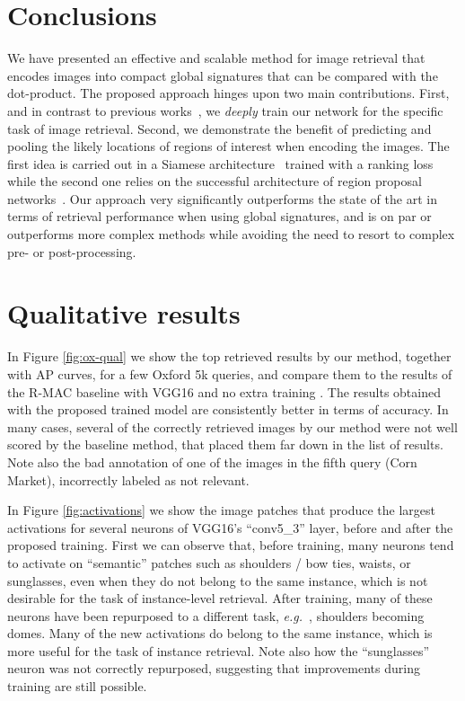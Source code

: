 \documentclass[runningheads]{llncs}
\def\eg{\emph{e.g.}~}
\begin{document}
 \section{Conclusions}
 \label{sec:conclusions}
 We have presented an effective and scalable method for image retrieval that encodes images into compact global signatures that can be compared with the dot-product. 
 The proposed approach hinges upon two main contributions. First, and in contrast to previous works~\cite{Razavian2014,Perronnin2015,Gong2014}, we \emph{deeply}
 train our network for the specific task of image retrieval.
 Second, we demonstrate the benefit of predicting and pooling the likely locations of regions of interest when encoding the images.
 The first idea is carried out in a Siamese architecture~\cite{Hadsell2006} trained with a ranking loss while the second one relies on the successful architecture of region proposal networks~\cite{Ren2015faster}.
 Our approach very significantly outperforms the state of the art in terms of retrieval performance when using global signatures, and is on par or outperforms more complex methods while avoiding the need to resort to complex pre- or post-processing.


 
 

\clearpage
\appendix
\section{Qualitative results}\label{s:qualitative}
In Figure \ref{fig:ox-qual} we show the top retrieved results by our method, together with AP curves, for a few Oxford 5k queries, and compare them to the results of the R-MAC baseline with VGG16 and no extra training \cite{Tolias2016}. 
The results obtained with the proposed trained model are consistently better in terms of accuracy.
In many cases, several of the correctly retrieved images by our method were not well scored by the baseline method, that placed them far down in the list of results. 
Note also the bad annotation of one of the images in the fifth query (Corn Market), incorrectly labeled as not relevant.

In Figure \ref{fig:activations} we show the image patches that produce the largest activations for several neurons of VGG16's ``conv5\_3'' layer, before and after the proposed training.
First we can observe that, before training, many neurons tend to activate on ``semantic'' patches such as shoulders / bow ties, waists, or sunglasses, even when they do not belong to the same instance, which is not desirable for the task of instance-level retrieval.
After training, many of these neurons have been repurposed to a different task, \eg, shoulders becoming domes.
Many of the new activations do belong to the same instance, which is more useful for the task of instance retrieval.
Note also how the ``sunglasses'' neuron was not correctly repurposed, suggesting that improvements during training are still possible.
\end{document}
